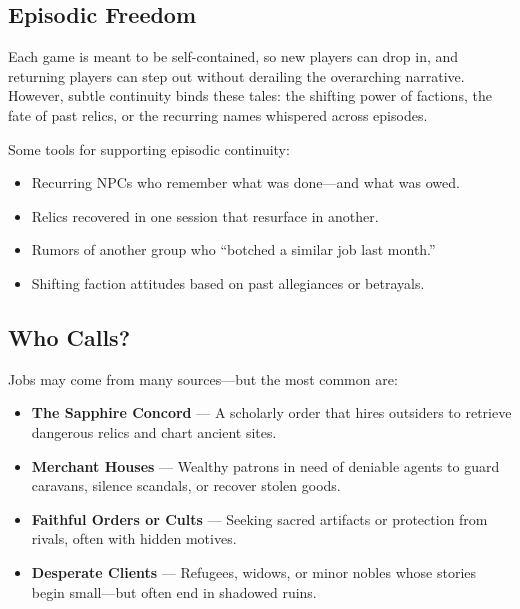 \vspace{0.5\baselineskip}
\subsection*{Episodic Freedom}

Each game is meant to be self-contained, so new players can drop in, and returning players can step out without derailing the overarching narrative. However, subtle continuity binds these tales: the shifting power of factions, the fate of past relics, or the recurring names whispered across episodes.

Some tools for supporting episodic continuity:

\begin{itemize}
    \item Recurring NPCs who remember what was done—and what was owed.
    \item Relics recovered in one session that resurface in another.
    \item Rumors of another group who “botched a similar job last month.”
    \item Shifting faction attitudes based on past allegiances or betrayals.
\end{itemize}

\vspace{0.5\baselineskip}
\subsection*{Who Calls?}

Jobs may come from many sources—but the most common are:

\begin{itemize}
    \item \textbf{The Sapphire Concord} — A scholarly order that hires outsiders to retrieve dangerous relics and chart ancient sites.
    \item \textbf{Merchant Houses} — Wealthy patrons in need of deniable agents to guard caravans, silence scandals, or recover stolen goods.
    \item \textbf{Faithful Orders or Cults} — Seeking sacred artifacts or protection from rivals, often with hidden motives.
    \item \textbf{Desperate Clients} — Refugees, widows, or minor nobles whose stories begin small—but often end in shadowed ruins.
\end{itemize}

\vspace{0.5\baselineskip}
